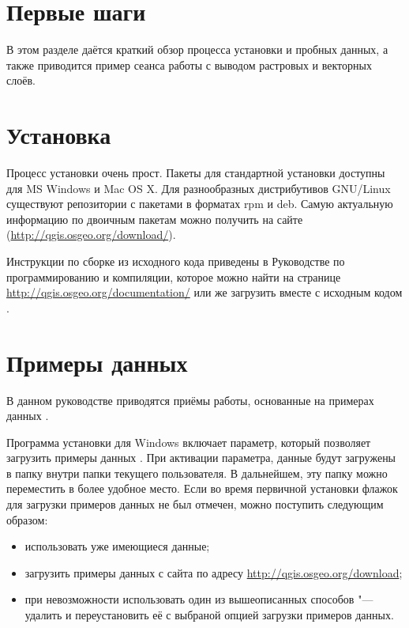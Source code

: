 
\section{Первые шаги}\label{label_getstarted}


В этом разделе даётся краткий обзор процесса установки \qg и пробных
данных, а также приводится пример сеанса работы с выводом растровых и векторных
слоёв.

\section{Установка}\label{label_installation}

Процесс установки \qg очень прост. Пакеты для стандартной установки
доступны для MS Windows и Mac OS X. Для разнообразных дистрибутивов
GNU/Linux существуют репозитории с пакетами в форматах rpm и deb. Самую
актуальную информацию по двоичным пакетам можно получить на сайте
\qg (\url{http://qgis.osgeo.org/download/}).


Инструкции по сборке \qg из исходного кода приведены в Руководстве
по программированию и компиляции, которое можно найти на странице
\url{http://qgis.osgeo.org/documentation/} или же загрузить вместе
с исходным кодом \qg.

\section{Примеры данных}\label{label_sampledata}

В данном руководстве приводятся приёмы работы, основанные на примерах данных
\qg.

\win Программа установки для Windows включает параметр, который позволяет
загрузить примеры данных \qg. При активации параметра, данные будут загружены в папку
 внутри папки 
текущего пользователя. В дальнейшем, эту папку можно переместить в более
удобное место. Если во время первичной установки \qg флажок для загрузки
примеров данных не был отмечен, можно поступить следующим образом:
\begin{itemize}[label=--]
\item использовать уже имеющиеся данные;
\item загрузить примеры данных с сайта \qg по адресу \url{http://qgis.osgeo.org/download};
\item при невозможности использовать один из вышеописанных способов "---
удалить \qg и переустановить её с выбраной опцией загрузки примеров данных.
\end{itemize}

